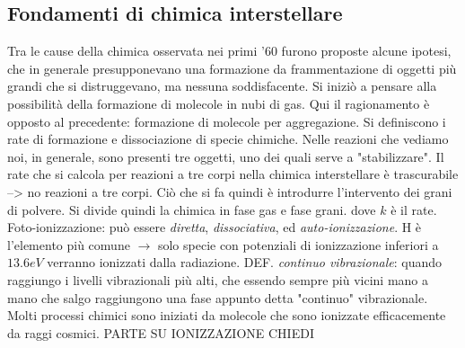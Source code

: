 \subsection{Fondamenti di chimica interstellare}
Tra le cause della chimica osservata nei primi '60 furono proposte alcune ipotesi, che in generale presupponevano una formazione da frammentazione di oggetti più grandi che si distruggevano, ma nessuna soddisfacente. 
Si iniziò a pensare alla possibilità della formazione di molecole in nubi di gas.
Qui il ragionamento è opposto al precedente: formazione di molecole per aggregazione.
Si definiscono i rate di formazione e dissociazione di specie chimiche.
Nelle reazioni che vediamo noi, in generale, sono presenti tre oggetti, uno dei quali serve a "stabilizzare". 
Il rate che si calcola per reazioni a tre corpi nella chimica interstellare è trascurabile --> no reazioni a tre corpi.
Ciò che si fa quindi è introdurre l'intervento dei grani di polvere.
Si divide quindi la chimica in fase gas e fase grani.
dove $k$ è il rate.
Foto-ionizzazione: può essere \textit{diretta}, \textit{dissociativa}, ed \textit{auto-ionizzazione}.
H è l'elemento più comune $\xrightarrow{}$ solo specie con potenziali di ionizzazione inferiori a $13.6eV$ verranno ionizzati dalla radiazione.
DEF. \textit{continuo vibrazionale}: quando raggiungo i livelli vibrazionali più alti, che essendo sempre più vicini mano a mano che salgo raggiungono una fase appunto detta "continuo" vibrazionale.
Molti processi chimici sono iniziati da molecole che sono ionizzate efficacemente da raggi cosmici.
PARTE SU IONIZZAZIONE CHIEDI
  




